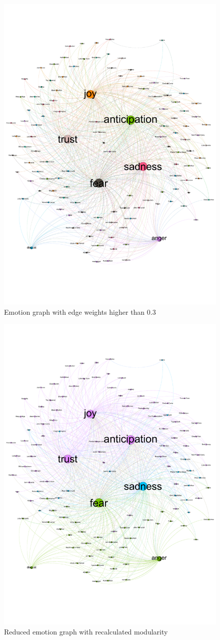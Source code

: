 \documentclass[10pt,a4paper]{article}
\begin{document}
		\begin{figure}[htb]
			\centering
			\includegraphics[trim=0mm 50mm 0mm 30mm, clip, width=0.7\linewidth]{data/emotion_graph_weight3-7}
			\caption{Emotion graph with edge weights higher than $0.3$}
			\label{fig:reducedemotiongraph}
		\end{figure}
		
		\begin{figure}[htb]
			\centering
			\includegraphics[trim=0mm 50mm 0mm 30mm, clip, width=0.7\linewidth]{data/emotion_graph_new_modularity}
			\caption{Reduced emotion graph with recalculated modularity}
			\label{fig:emotionnewmod}
		\end{figure}
		
\end{document}
